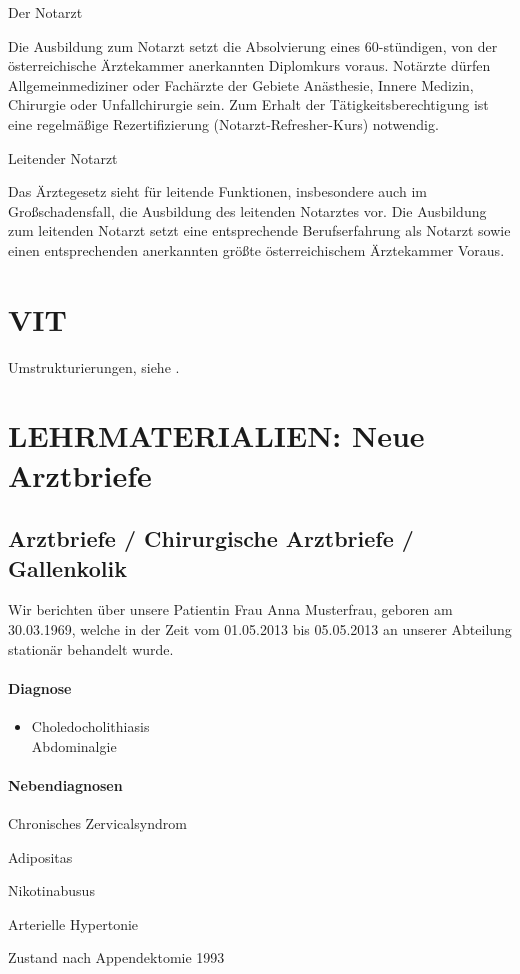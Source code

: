 \documentclass[
ngerman,
paper=a4,
asymmetric,
fontsize=10pt,
draft=false,
numbers=noenddot,
bibtotocnumbered,
footnotes=multiple,
]{scrreprt}
\newcommand{\jNEU}{\vspace{6pt}\noindent{\color{green}\sffamily\textbf{ADDED}\hrulefill\newline}}
\newcommand{\jNEUende}{\newline{\color{green}\rule{\linewidth}{3pt}\newline}}
\begin{document}
Der Notarzt

Die Ausbildung zum Notarzt setzt die Absolvierung eines 60-stündigen, von der
österreichische Ärztekammer anerkannten Diplomkurs voraus.
Notärzte dürfen
Allgemeinmediziner oder Fachärzte der Gebiete Anästhesie,
Innere Medizin, Chirurgie oder Unfallchirurgie sein. Zum Erhalt der
Tätigkeitsberechtigung ist eine regelmäßige
Rezertifizierung (Notarzt-Refresher-Kurs) notwendig.

Leitender Notarzt

Das Ärztegesetz sieht für leitende Funktionen, insbesondere
auch im Großschadensfall, die Ausbildung des leitenden
Notarztes vor. Die Ausbildung zum leitenden Notarzt setzt
eine entsprechende Berufserfahrung als Notarzt sowie einen
entsprechenden anerkannten größte österreichischem
Ärztekammer Voraus.
\jNEUende

\section{VIT}
Umstrukturierungen, siehe .

\section{LEHRMATERIALIEN: Neue Arztbriefe}
\subsection{Arztbriefe / Chirurgische Arztbriefe / Gallenkolik}

\jNEU
Wir berichten über unsere Patientin  Frau Anna Musterfrau,
geboren am 30.03.1969, welche in der Zeit vom
01.05.2013 bis 05.05.2013 an unserer Abteilung stationär
behandelt wurde.

\paragraph{Diagnose}
\begin{itemize}
  \item Choledocholithiasis\\
Abdominalgie
\end{itemize}


\paragraph{Nebendiagnosen}

\begin{compactitem}
  \item Chronisches Zervicalsyndrom
  \item Adipositas 
  \item Nikotinabusus 
  \item Arterielle Hypertonie 
  \item Zustand
nach Appendektomie 1993
\end{compactitem}
\end{document}
